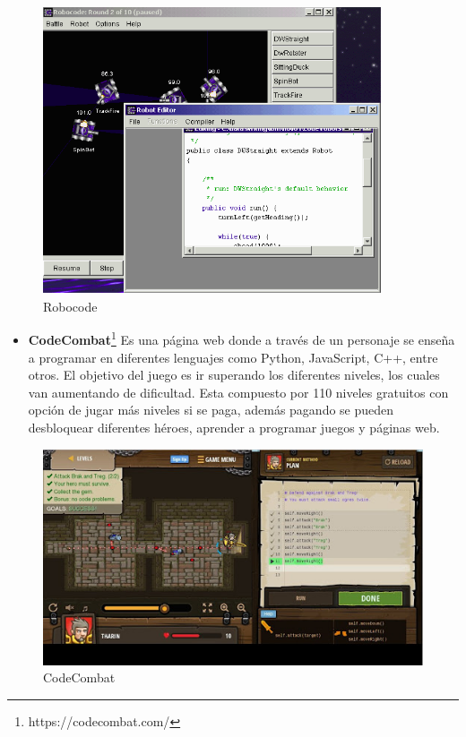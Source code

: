 \begin{figure}[H]
    \centering
    \includegraphics[width=10cm, keepaspectratio]{img/Robocode.png}
    \caption{Robocode}
    \label{fig:robocode}
\end{figure}

\begin{itemize}
\item \textbf{CodeCombat}\footnote{ https://codecombat.com/} Es una página web donde a través de un personaje se enseña a programar en diferentes lenguajes como Python, JavaScript, C++, entre otros. El objetivo del juego es ir superando los diferentes niveles, los cuales van aumentando de dificultad. Esta compuesto por 110 niveles gratuitos con opción de jugar más niveles si se paga, además pagando se pueden desbloquear diferentes héroes, aprender a programar juegos y páginas web.\cite{app}
\end{itemize}

\begin{figure}[H]
    \centering
    \includegraphics[width=15cm, keepaspectratio]{img/Codecombat.jpg}
    \caption{CodeCombat}
    \label{fig:codecombat}
\end{figure}

